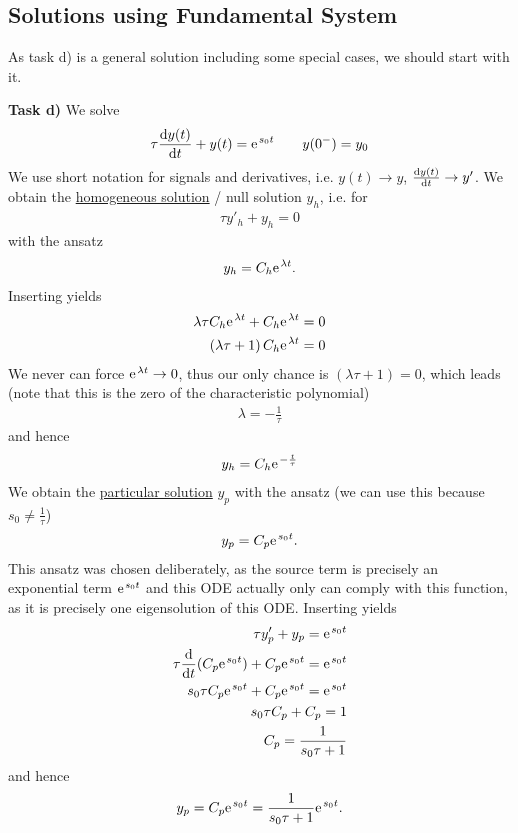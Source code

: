 \documentclass[11pt,a4paper,DIV=12]{scrartcl}
\begin{document}
\subsection{Solutions using Fundamental System}

As task d) is a general solution including some special cases, we should start with it.

\textbf{Task d)}
We solve
\begin{align}
\tau \frac{\fsd y(t)}{\fsd t} + y(t) = \e^{s_0 t} \qquad y(0^-) = y_0
\end{align}
We use short notation for signals and derivatives, i.e. $y(t)\rightarrow y$, $\frac{\mathrm{d} y(t)}{\mathrm{d} t} \rightarrow y'$.
%
We obtain the \underline{homogeneous solution} / null solution $y_h$, i.e. for
\begin{align}
\tau y'_h + y_h = 0
\end{align}
with the ansatz
\begin{align}
y_h = C_h \e^{\lambda t}.
\end{align}
Inserting yields
\begin{align}
\lambda \tau C_h \e^{\lambda t} + C_h \e^{\lambda t} = 0\\
(\lambda \tau +1 ) \, C_h \e^{\lambda t} = 0
\end{align}
We never can force $\e^{\lambda t} \rightarrow 0$, thus our only chance is $(\lambda \tau + 1)=0$, which leads (note that this is the zero of the characteristic polynomial)
\begin{align}
\lambda = -\frac{1}{\tau}
\end{align}
and hence
\begin{align}
y_h = C_h \e^{- \frac{t}{\tau}}
\end{align}
%
We obtain the \underline{particular solution} $y_p$ with the ansatz (we can use this because $s_0 \neq \frac{1}{\tau}$)
\begin{align}
y_p = C_p \e^{s_0 t}.
\end{align}
%
This ansatz was chosen deliberately, as the source term is precisely an exponential term $\e^{s_0 t}$ and this ODE actually only can comply with this function, as it is precisely one eigensolution of this ODE.
%
Inserting yields
\begin{align}
\tau y'_p + y_p = \e^{s_0 t}\\
\tau \frac{\fsd}{\fsd t}(C_p \e^{s_0 t}) + C_p \e^{s_0 t} = \e^{s_0 t}\\
s_0 \tau C_p \e^{s_0 t} + C_p \e^{s_0 t} = \e^{s_0 t}\\
s_0 \tau C_p + C_p = 1\\
C_p = \frac{1}{s_0 \tau + 1}
\end{align}
and hence
\begin{align}
y_p = C_p \e^{s_0 t} = \frac{1}{s_0 \tau + 1} \e^{s_0 t}.
\end{align}
\end{document}
